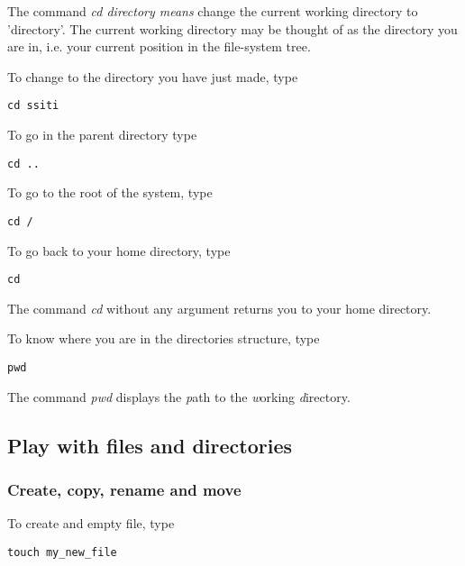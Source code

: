 \documentclass[two_sides]{my_article}
\begin{document}
The command \emph{cd directory means} change the current working directory to 'directory'. The current working directory may be thought of as the directory you are in, i.e. your current position in the file-system tree.

To change to the directory you have just made, type
\begin{lstlisting}[frame=lines, numbers=none]
cd ssiti
\end{lstlisting}

To go in the parent directory type

\begin{lstlisting}[frame=lines, numbers=none]
cd ..
\end{lstlisting}

To go to the root of the system, type

\begin{lstlisting}[frame=lines, numbers=none]
cd /
\end{lstlisting}

To go back to your home directory, type

\begin{lstlisting}[frame=lines, numbers=none]
cd
\end{lstlisting}

The command \emph{cd} without any argument returns you to your home directory.

To know where you are in the directories structure, type

\begin{lstlisting}[frame=lines, numbers=none]
pwd
\end{lstlisting}

The command \emph{pwd} displays the \emph{p}ath to the \emph{w}orking \emph{d}irectory.

\subsection{Play with files and directories}

\subsubsection{Create, copy, rename and move}

To create and empty file, type

\begin{lstlisting}[frame=lines, numbers=none]
touch my_new_file
\end{lstlisting}
\end{document}
